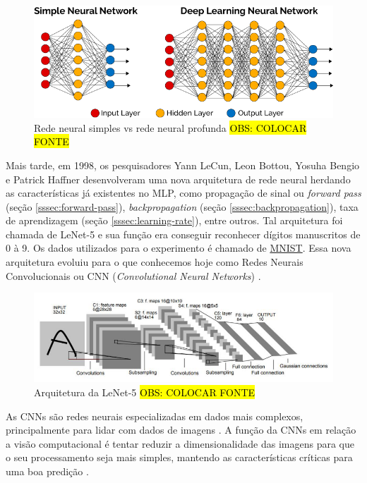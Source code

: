 
\begin{figure}[H]
  \includegraphics[width=\linewidth]{figuras/simple-vs-deep-nn.png}
  \caption{Rede neural simples vs rede neural profunda \hl{OBS: COLOCAR FONTE}}
  \label{fig:simple-vs-deep-nn}
\end{figure}

Mais tarde, em 1998, os pesquisadores Yann LeCun, Leon Bottou, Yosuha Bengio e Patrick Haffner desenvolveram uma nova arquitetura de rede neural herdando as características já existentes no MLP, como propagação de sinal ou \textit{forward pass} (seção \ref{sssec:forward-pass}), \textit{backpropagation} (seção \ref{sssec:backpropagation}), taxa de aprendizagem (seção \ref{sssec:learning-rate}), entre outros. Tal arquitetura foi chamada de LeNet-5 \cite{le-net} e sua função era conseguir reconhecer dígitos manuscritos de 0 à 9. Os dados utilizados para o experimento é chamado de \href{http://yann.lecun.com/exdb/mnist/}{MNIST}. Essa nova arquitetura evoluiu para o que conhecemos hoje como Redes Neurais Convolucionais ou CNN (\textit{Convolutional Neural Networks}) \cite{goodfellow-et-al-2016}.

\begin{figure}[H]
  \includegraphics[width=\linewidth]{figuras/le-net.png}
  \caption{Arquitetura da LeNet-5 \hl{OBS: COLOCAR FONTE}}
  \label{fig:le-net}
\end{figure}

As CNNs são redes neurais especializadas em dados mais complexos, principalmente para lidar com dados de imagens \cite{goodfellow-et-al-2016}. A função da CNNs em relação a visão computacional é tentar reduzir a dimensionalidade das imagens para que o seu processamento seja mais simples, mantendo as características críticas para uma boa predição \cite{comprehensive-guide-to-cvv}.

